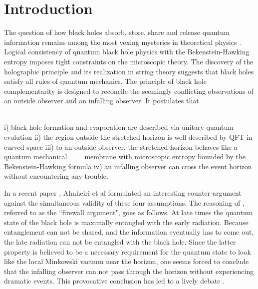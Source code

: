 \documentclass[12pt]{article}%
\def\spc{\hspace{.5pt}}
\begin{document}
\def\oneovertN{{1\over N}} %
\def\oneoversqN{{1 \over \sqrt{N} }} %
\def\oneoverZ{\frac{\raisebox{-1pt}{\small $1$}}{\raisebox{.5pt}{\small $Z$\spc}}}
\def\oneoverNZ{\frac{\raisebox{-1pt}{\small $1$}}{\raisebox{.5pt}{\small $N\nspc Z$\spc}}}
\def\iii{i}
\def\jjj{j}
\def\bh{{\mbox{\fontsize{7pt}{.7pt}{$BH$}}}}%
\enlargethispage{\baselineskip}

\setcounter{tocdepth}{2}
\tableofcontents

\newpage
\addtolength{\baselineskip}{.25mm}
\addtolength{\parskip}{.3mm}
\renewcommand\Large{\fontsize{15.5}{16}\selectfont}

\section{Introduction}

The question of how black holes absorb, store, share and release quantum information remains among the most vexing mysteries
in theoretical physics \cite{hawking,unruh}.  Logical consistency of quantum black hole physics with the Bekenstein-Hawking entropy  
\cite{bekenstein,hawking} imposes tight constraints on the microscopic theory. The discovery of the holographic principle  
\cite{hoofthologram}\cite{susskindhologram} and its realization in string theory \cite{maldacena} suggests that  black holes satisfy all rules of 
quantum mechanics.   The principle of black hole complementarity \cite{susskindcompl} is designed to reconcile the seemingly 
conflicting observations of  an outside observer and an infalling observer. It postulates that\\[2.5mm]
${}$~~\parbox{15.5cm}{\addtolength{\baselineskip}{1mm}
i)\;\; black hole formation and evaporation are described via unitary quantum evolution 
ii)\; the region outside the stretched horizon is well described by QFT in curved space
iii) to an outside observer, the stretched horizon behaves like a quantum mechanical  ${}$~~~~${}$\,\spc membrane
with microscopic entropy bounded by the Bekenstein-Hawking formula iv) an infalling observer can cross the event horizon without encountering any trouble.}

\medskip

In a recent paper \cite{amps}, Almheiri et al formulated an interesting counter-argument against the simultaneous validity of these four assumptions. 
The reasoning of \cite{amps}, referred to as the ``firewall argument",  goes as follows. At late times the quantum state of the black hole is maximally entangled with the early radiation. Because entanglement can not be shared, and the information eventually has to come out, the late radiation can not be entangled with the black hole. Since the latter property is believed to be a necessary requirement for the quantum state to look like the local Minkowski vacuum near the horizon, one seems forced to conclude that the infalling observer can not pass through the horizon without experiencing dramatic events. This provocative conclusion has led to a lively debate \cite{followup}\cite{susskind-entanglement}.
\end{document}
